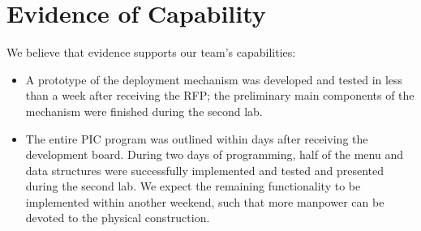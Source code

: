 \documentclass[11pt]{report}
\begin{document}
\section{Evidence of Capability}
We believe that evidence supports our team's capabilities:
\begin{itemize}
\item {A prototype of the deployment mechanism was developed and tested in less than a week after receiving the RFP; the preliminary main components of the mechanism were finished during the second lab.}
\item {The entire PIC program was outlined within days after receiving the development board. During two days of programming, half of the menu and data structures were successfully implemented and tested and presented during the second lab. We expect the remaining functionality to be implemented within another weekend, such that more manpower can be devoted to the physical construction.}
\end{itemize}
%
\end{document}
